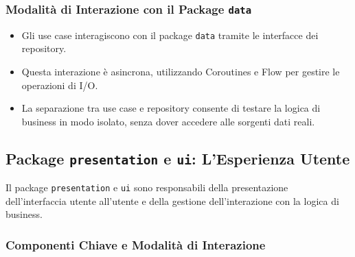 \documentclass{article}
\begin{document}
\subsubsection{Modalità di Interazione con il Package \texttt{data}}

\begin{itemize}
    \item Gli use case interagiscono con il package \texttt{data} tramite le interfacce dei repository.
    \item Questa interazione è asincrona, utilizzando Coroutines e Flow per gestire le operazioni di I/O.
    \item La separazione tra use case e repository consente di testare la logica di business in modo isolato, senza dover accedere alle sorgenti dati reali.
\end{itemize}

\subsection{Package \texttt{presentation} e \texttt{ui}: L'Esperienza Utente}

Il package \texttt{presentation} e \texttt{ui} sono responsabili della presentazione dell'interfaccia utente all'utente e della gestione dell'interazione con la logica di business.

\subsubsection{Componenti Chiave e Modalità di Interazione}
\end{document}
